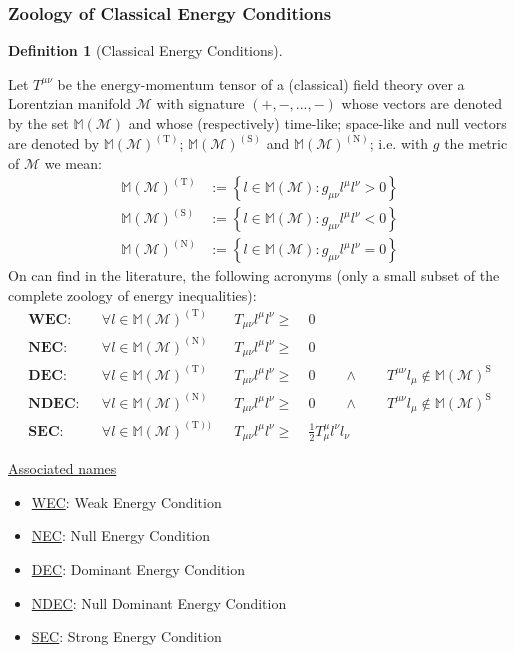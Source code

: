 \documentclass[a4paper,11pt]{article}
\numberwithin{equation}{section}
\theoremstyle{definition}
\newtheorem{definition}{Definition}
\begin{document}
\subsubsection{Zoology of Classical Energy Conditions}
\begin{definition}[Classical Energy Conditions]$\quad$

    Let $T^{\mu\nu}$ be the energy-momentum tensor of a (classical) field theory over a Lorentzian manifold $\mathcal{M}$ with signature $(+,-,...,-)$ whose vectors are denoted by the set $\mathbb{M}(\mathcal{M})$ and whose (respectively) time-like; space-like and null vectors are denoted by  $\mathbb{M}(\mathcal{M})^{(\mathrm{T})}$; $\mathbb{M}(\mathcal{M})^{(\mathrm{S})}$ and $\mathbb{M}(\mathcal{M})^{(\mathrm{N})}$; i.e. with $g$ the metric of $\mathcal{M}$ we mean:
    \begin{align*}
        \mathbb{M}(\mathcal{M})^{(\mathrm{T})}&:=\left\{l\in\mathbb{M}(\mathcal{M}):g_{\mu\nu}l^\mu l^\nu>0\right\}\\
        \mathbb{M}(\mathcal{M})^{(\mathrm{S})}&:=\left\{l\in\mathbb{M}(\mathcal{M}):g_{\mu\nu}l^\mu l^\nu<0\right\}\\
        \mathbb{M}(\mathcal{M})^{(\mathrm{N})}&:=\left\{l\in\mathbb{M}(\mathcal{M}):g_{\mu\nu}l^\mu l^\nu=0\right\}
    \end{align*}
On can find in the literature, the following acronyms (only a small subset of the complete zoology of energy inequalities):
\begin{align*}
\textbf{WEC}: && \forall l \in \mathbb{M}(\mathcal{M})^{(\mathrm{T})} && T_{\mu\nu}l^\mu l^\nu\geq \;& 0\\
\textbf{NEC}: && \forall l \in \mathbb{M}(\mathcal{M})^{(\mathrm{N})} && T_{\mu\nu}l^\mu l^\nu\geq \;& 0\\
\textbf{DEC}: && \forall l \in \mathbb{M}(\mathcal{M})^{(\mathrm{T})} && T_{\mu\nu}l^\mu l^\nu\geq \;& 0 \quad \quad \wedge \quad \quad T^{\mu\nu}l_\mu \notin\mathbb{M}(\mathcal{M})^{\mathrm{S}}\\
\textbf{NDEC}: && \forall l \in \mathbb{M}(\mathcal{M})^{(\mathrm{N})} && T_{\mu\nu}l^\mu l^\nu\geq \;& 0 \quad \quad \wedge \quad \quad T^{\mu\nu}l_\mu \notin\mathbb{M}(\mathcal{M})^{\mathrm{S}}\\
\textbf{SEC}: && \forall l \in \mathbb{M}(\mathcal{M})^{(\mathrm{T}))} && T_{\mu\nu}l^\mu l^\nu\geq \;& \frac{1}{2}T^\mu_\mu l^\nu l_\nu
\end{align*}
\end{definition}
\underline{Associated names}
\begin{itemize}
    \item \underline{WEC}: Weak Energy Condition
    \item \underline{NEC}: Null Energy Condition
    \item \underline{DEC}: Dominant Energy Condition
    \item \underline{NDEC}: Null Dominant Energy Condition
    \item \underline{SEC}: Strong Energy Condition
\end{itemize}
\end{document}
